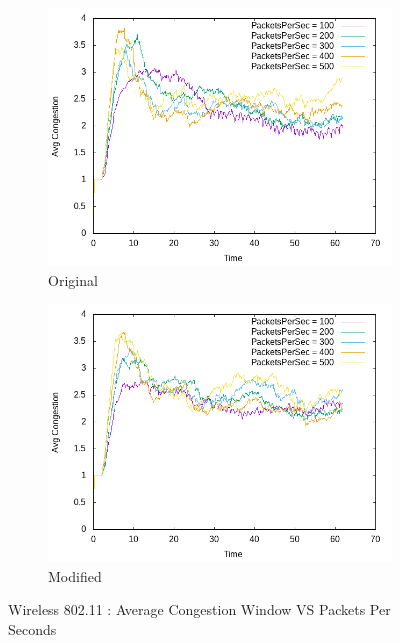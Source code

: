     \begin{figure}[!h] 
    	\centering
    	
    	\begin{subfigure}{0.9\textwidth} %
    		\includegraphics[width=.95\textwidth]{Pictures/Wireless802.11Mobile/Original/Avg_CongestionVSPacketsPerSec.png}
    		 \caption{Original} %
    	\end{subfigure}
    	
    	\vspace{1em} %
    	
    	\begin{subfigure}{0.9\textwidth} %
    		\includegraphics[width=.95\textwidth]{Pictures/Wireless802.11Mobile/Modified/Avg_CongestionVSPacketsPerSec.png}
    		 \caption{ Modified} %
    	\end{subfigure}
    	
    	 \caption{Wireless 802.11 : Average Congestion Window VS Packets Per Seconds} %
    \end{figure}
    
